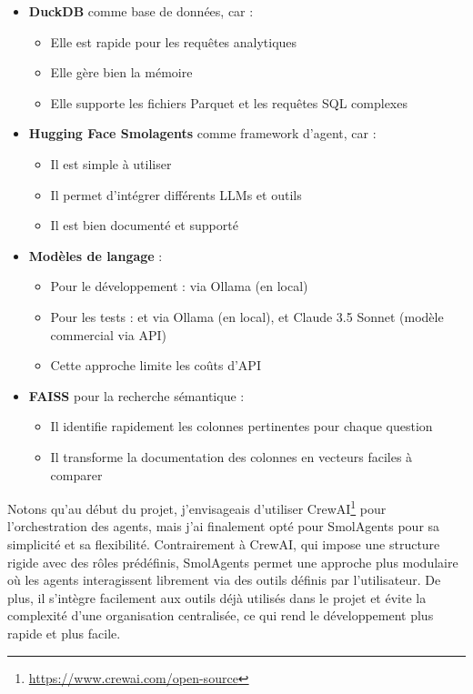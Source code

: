\documentclass[a4paper,11pt]{article}
\begin{document}
\begin{itemize}
    \item \textbf{DuckDB} comme base de données, car :
    \begin{itemize}
        \item Elle est rapide pour les requêtes analytiques
        \item Elle gère bien la mémoire
        \item Elle supporte les fichiers Parquet et les requêtes SQL complexes
    \end{itemize}
    \item \textbf{Hugging Face Smolagents} comme framework d'agent, car :
    \begin{itemize}
        \item Il est simple à utiliser
        \item Il permet d'intégrer différents LLMs et outils
        \item Il est bien documenté et supporté
    \end{itemize}
    \item \textbf{Modèles de langage} :
    \begin{itemize}
        \item Pour le développement :  via Ollama (en local)
        \item Pour les tests :  et  via Ollama (en local), et Claude 3.5 Sonnet (modèle commercial via API)
        \item Cette approche limite les coûts d'API
    \end{itemize}
    \item \textbf{FAISS} pour la recherche sémantique :
    \begin{itemize}
        \item Il identifie rapidement les colonnes pertinentes pour chaque question
        \item Il transforme la documentation des colonnes en vecteurs faciles à comparer
    \end{itemize}
\end{itemize}

Notons qu'au début du projet, j'envisageais d'utiliser CrewAI\footnote{\url{https://www.crewai.com/open-source}} pour l'orchestration des agents, mais j'ai finalement opté pour SmolAgents pour sa simplicité et sa flexibilité.
Contrairement à CrewAI, qui impose une structure rigide avec des rôles prédéfinis, SmolAgents permet une approche plus modulaire où les agents interagissent librement via des outils définis par l’utilisateur. 
De plus, il s’intègre facilement aux outils déjà utilisés dans le projet et évite la complexité d’une organisation centralisée, ce qui rend le développement plus rapide et plus facile.
\end{document}
